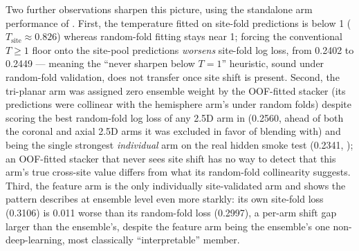 \documentclass[10pt]{article}
\begin{document}
\begin{table}[t]
\centering
\small
\caption{Standalone out-of-fold performance of each arm considered for the five-pillar ensemble, plus the excluded tri-planar candidate. Weight is each arm's share of the separate, OOF-\emph{fitted} Master Final stack --- a different weighting from the equal-weight Master v2 ensemble whose shift gap is reported above () --- in which the tri-planar candidate was evaluated and assigned zero weight. Site-fold numbers are reported only for the feature arm, the one arm individually site-validated before assembly.}
\label{tab:arms}
\end{table}

Two further observations sharpen this picture, using the standalone arm performance of . First, the temperature fitted on site-fold predictions is below 1 ($T_{\text{site}} \approx 0.826$) whereas random-fold fitting stays near 1; forcing the conventional $T \geq 1$ floor onto the site-pool predictions \emph{worsens} site-fold log loss, from 0.2402 to 0.2449 --- meaning the ``never sharpen below $T=1$'' heuristic, sound under random-fold validation, does not transfer once site shift is present. Second, the tri-planar arm was assigned zero ensemble weight by the OOF-fitted stacker (its predictions were collinear with the hemisphere arm's under random folds) despite scoring the best random-fold log loss of any 2.5D arm in  (0.2560, ahead of both the coronal and axial 2.5D arms it was excluded in favor of blending with) and being the single strongest \emph{individual} arm on the real hidden smoke test (0.2341, ); an OOF-fitted stacker that never sees site shift has no way to detect that this arm's true cross-site value differs from what its random-fold collinearity suggests. Third, the feature arm is the only individually site-validated arm and shows the pattern  describes at ensemble level even more starkly: its own site-fold loss (0.3106) is 0.011 worse than its random-fold loss (0.2997), a per-arm shift gap larger than the ensemble's, despite the feature arm being the ensemble's one non-deep-learning, most classically ``interpretable'' member.
\end{document}
